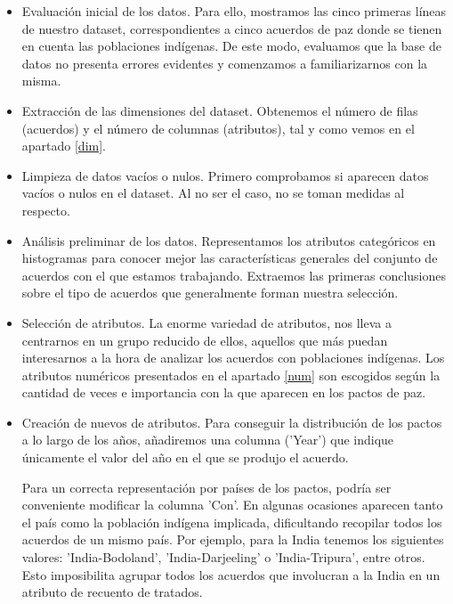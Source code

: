 \documentclass[11pt]{article}
\begin{document}
\begin{itemize}
    \item Evaluación inicial de los datos. Para ello, mostramos las cinco primeras líneas de nuestro dataset, correspondientes a cinco acuerdos de paz donde se tienen en cuenta las poblaciones indígenas. De este modo, evaluamos que la base de datos no presenta errores evidentes y comenzamos a familiarizarnos con la misma.
    
    \item Extracción de las dimensiones del dataset. Obtenemos el número de filas (acuerdos) y el número de columnas (atributos), tal y como vemos en el apartado \ref{dim}.
    
    \item Limpieza de datos vacíos o nulos. Primero comprobamos si aparecen datos vacíos o nulos en el dataset. Al no ser el caso, no se toman medidas al respecto.
    
    \item Análisis preliminar de los datos. Representamos los atributos categóricos en histogramas para conocer mejor las características generales del conjunto de acuerdos con el que estamos trabajando. Extraemos las primeras conclusiones sobre el tipo de acuerdos que generalmente forman nuestra selección.
    
    \item Selección de atributos. La enorme variedad de atributos, nos lleva a centrarnos en un grupo reducido de ellos, aquellos que más puedan interesarnos a la hora de analizar los acuerdos con poblaciones indígenas. Los atributos numéricos presentados en el apartado \ref{num} son escogidos según la cantidad de veces e importancia con la que aparecen en los pactos de paz.
    
    \item Creación de nuevos de atributos. Para conseguir la distribución de los pactos a lo largo de los años, añadiremos una columna ('Year') que indique únicamente el valor del año en el que se produjo el acuerdo. 
    
    Para un correcta representación por países de los pactos, podría ser conveniente modificar la columna 'Con'. En algunas ocasiones
    aparecen tanto el país como la población indígena implicada, dificultando recopilar todos los acuerdos de un mismo país. Por ejemplo, para la India tenemos los siguientes valores: 'India-Bodoland', 'India-Darjeeling' o 'India-Tripura', entre otros. Esto imposibilita agrupar todos los acuerdos que involucran a la India en un atributo de recuento de tratados.
    

\end{itemize}
\end{document}
